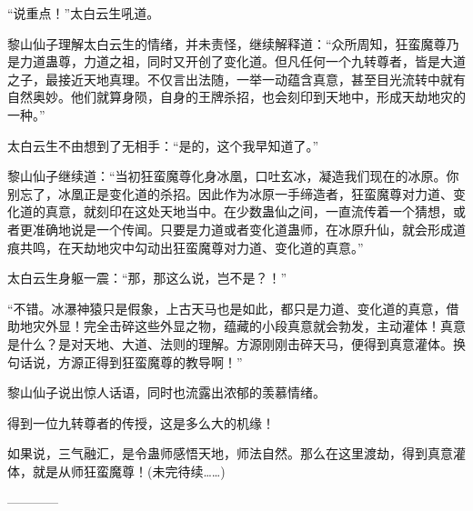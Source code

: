 \begin{this_body}
“说重点！”太白云生吼道。

黎山仙子理解太白云生的情绪，并未责怪，继续解释道：“众所周知，狂蛮魔尊乃是力道蛊尊，力道之祖，同时又开创了变化道。但凡任何一个九转尊者，皆是大道之子，最接近天地真理。不仅言出法随，一举一动蕴含真意，甚至目光流转中就有自然奥妙。他们就算身陨，自身的王牌杀招，也会刻印到天地中，形成天劫地灾的一种。”

太白云生不由想到了无相手：“是的，这个我早知道了。”

黎山仙子继续道：“当初狂蛮魔尊化身冰凰，口吐玄冰，凝造我们现在的冰原。你别忘了，冰凰正是变化道的杀招。因此作为冰原一手缔造者，狂蛮魔尊对力道、变化道的真意，就刻印在这处天地当中。在少数蛊仙之间，一直流传着一个猜想，或者更准确地说是一个传闻。只要是力道或者变化道蛊师，在冰原升仙，就会形成道痕共鸣，在天劫地灾中勾动出狂蛮魔尊对力道、变化道的真意。”

太白云生身躯一震：“那，那这么说，岂不是？！”

“不错。冰瀑神猿只是假象，上古天马也是如此，都只是力道、变化道的真意，借助地灾外显！完全击碎这些外显之物，蕴藏的小段真意就会勃发，主动灌体！真意是什么？是对天地、大道、法则的理解。方源刚刚击碎天马，便得到真意灌体。换句话说，方源正得到狂蛮魔尊的教导啊！”

黎山仙子说出惊人话语，同时也流露出浓郁的羡慕情绪。

得到一位九转尊者的传授，这是多么大的机缘！

如果说，三气融汇，是令蛊师感悟天地，师法自然。那么在这里渡劫，得到真意灌体，就是从师狂蛮魔尊！(未完待续……)

------------

\end{this_body}

